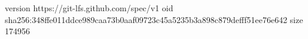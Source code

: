 version https://git-lfs.github.com/spec/v1
oid sha256:348ffe011ddce989caa73b0aaf09723c45a5235b3a898c879defff51ee76e642
size 174956
